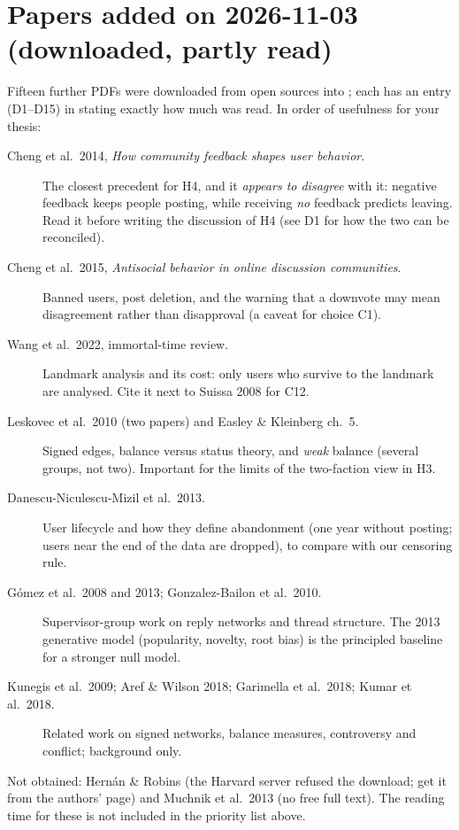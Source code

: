 \section{Papers added on 2026-11-03 (downloaded, partly read)}
Fifteen further PDFs were downloaded from open sources into ; each has an entry (D1--D15) in  stating exactly how much was read. In order of usefulness for your thesis:
\begin{description}
  \item[Cheng et al.\ 2014, \emph{How community feedback shapes user behavior}.] The closest precedent for H4, and it \emph{appears to disagree} with it: negative feedback keeps people posting, while receiving \emph{no} feedback predicts leaving. Read it before writing the discussion of H4 (see D1 for how the two can be reconciled).
  \item[Cheng et al.\ 2015, \emph{Antisocial behavior in online discussion communities}.] Banned users, post deletion, and the warning that a downvote may mean disagreement rather than disapproval (a caveat for choice C1).
  \item[Wang et al.\ 2022, immortal-time review.] Landmark analysis and its cost: only users who survive to the landmark are analysed. Cite it next to Suissa 2008 for C12.
  \item[Leskovec et al.\ 2010 (two papers) and Easley \& Kleinberg ch.\ 5.] Signed edges, balance versus status theory, and \emph{weak} balance (several groups, not two). Important for the limits of the two-faction view in H3.
  \item[Danescu-Niculescu-Mizil et al.\ 2013.] User lifecycle and how they define abandonment (one year without posting; users near the end of the data are dropped), to compare with our censoring rule.
  \item[G\'omez et al.\ 2008 and 2013; Gonzalez-Bailon et al.\ 2010.] Supervisor-group work on reply networks and thread structure. The 2013 generative model (popularity, novelty, root bias) is the principled baseline for a stronger null model.
  \item[Kunegis et al.\ 2009; Aref \& Wilson 2018; Garimella et al.\ 2018; Kumar et al.\ 2018.] Related work on signed networks, balance measures, controversy and conflict; background only.
\end{description}
Not obtained: Hern\'an \& Robins (the Harvard server refused the download; get it from the authors' page) and Muchnik et al.\ 2013 (no free full text). The reading time for these is not included in the priority list above.


